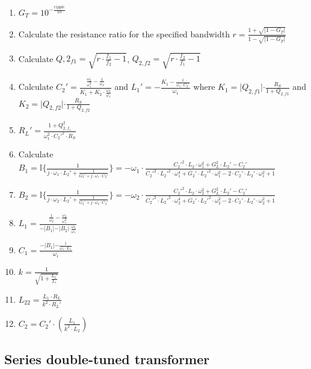 \begin{enumerate}
  \item $G_T = 10^{-\frac{ripple}{10}}$
  \item Calculate the resistance ratio for the specified bandwidth $r = \frac{1  + \sqrt{\lvert 1  - G_T \lvert}}{1  - \sqrt{\lvert 1  - G_T \lvert}}$
  \item Calculate $Q,{2_{f1}} = \sqrt{r \cdot \frac{f_1}{f_2} - 1}$, $Q_{2,{f2}} = \sqrt{r \cdot \frac{f_2}{f_1} - 1}$
  \item Calculate $C_2' = \frac{\frac{\omega_2}{\omega_1^2} - \frac{1}{\omega_2}}{K_1 + K_2 \cdot \frac{\omega_2}{\omega_1}}$ and $L_1' = -\frac{K_1 - \frac{1}{\omega_1 \cdot C_2'}}{\omega_1}$ where $K_1 = \lvert Q_{2, {f1}} \lvert \cdot \frac{R_S}{1 + Q_{2,{f1}}}$ and $K_2 = \lvert Q_{2,{f2}} \lvert \cdot \frac{R_S}{1 + Q_{2,{f2}}}$
  \item $R_L' = \frac{1 + Q^2_{2, f_1}}{\omega_1^2 \cdot C_2'^2 \cdot R_S}$
  \item Calculate $B_1 = \mathbb{I} \lbrace \frac{1}{j \cdot \omega_1 \cdot L_2' + \frac{1}{G_2' + j\cdot \omega_1 \cdot C_2'}} \rbrace = -\omega_1 \cdot \frac{C_2'^2 \cdot L_2 \cdot \omega_1^2 + G_L^2 \cdot L_2' -C_2'}{C_2'^2 \cdot L_2'^2 \cdot \omega_1^4 + G_2'\cdot L_2'^2 \cdot \omega_1^2 - 2 \cdot C_2' \cdot L_2' \cdot \omega_1^2 + 1}$
  \item $B_2 = \mathbb{I} \lbrace \frac{1}{j \cdot \omega_2 \cdot L_2' + \frac{1}{G_2' + j\cdot \omega_2 \cdot C_2'}} \rbrace = -\omega_2 \cdot \frac{C_2'^2 \cdot L_2 \cdot \omega_2^2 + G_L^2 \cdot L_2' -C_2'}{C_2'^2 \cdot L_2'^2 \cdot \omega_2^4 + G_2'\cdot L_2'^2 \cdot \omega_2^2 - 2 \cdot C_2' \cdot L_2' \cdot \omega_2^2 + 1}$
  \item $L_1 = \frac{\frac{1}{\omega_2} - \frac{\omega_2}{\omega_1^2}}{- \lvert B_1 \lvert - \lvert B_2 \lvert \cdot \frac{\omega_2}{\omega_1}}$
  \item $C_1 = \frac{-\lvert B_1 \lvert - \frac{1}{\omega_1 \cdot L_1}}{\omega_1}$
  \item $k = \frac{1}{\sqrt{1 + \frac{L_2'}{L_1}}}$
  \item $L_{22} = \frac{L_1 \cdot R_L}{k^2 \cdot R_L'} $
  \item $C_2 = C_2' \cdot \left( \frac{L_1}{k^2 \cdot L_2} \right)$
\end{enumerate}


\subsection{Series double-tuned transformer}

